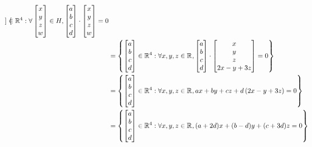\begin{solution}
\begin{align*}
{\begin{bmatrix}
		\end{bmatrix}
		\in\rmath[4]:
		\forall
		\begin{bmatrix}
			x \\ y \\ z \\ w
		\end{bmatrix}
		\in H,
		\begin{bmatrix}
			a \\ b \\ c \\ d
		\end{bmatrix}
		\cdot
		\begin{bmatrix}
			x \\ y \\ z \\ w
		\end{bmatrix}
		= 0
		}\\
		&=\set{
		\begin{bmatrix}
			a \\ b \\ c \\ d
		\end{bmatrix}
		\in\rmath[4]:
		\forall x, y, z\in\rmath,
		\begin{bmatrix}
			a \\ b \\ c \\ d
		\end{bmatrix}
		\cdot
		\begin{bmatrix}
			x \\ y \\ z \\ 2x - y + 3z
		\end{bmatrix}
		= 0
		}\\
		&=\set{
		\begin{bmatrix}
			a \\ b \\ c \\ d
		\end{bmatrix}
		\in\rmath[4]:
		\forall x, y, z\in\rmath, ax + by + cz + d\pa{2x - y + 3z} = 0
		}\\
		&=\set{
		\begin{bmatrix}
			a \\ b \\ c \\ d
		\end{bmatrix}
		\in\rmath[4]:
		\forall x, y, z\in\rmath, (a + 2d)x + (b - d)y + (c + 3d)z = 0
		}\\
	\end{align*}

\end{solution}
